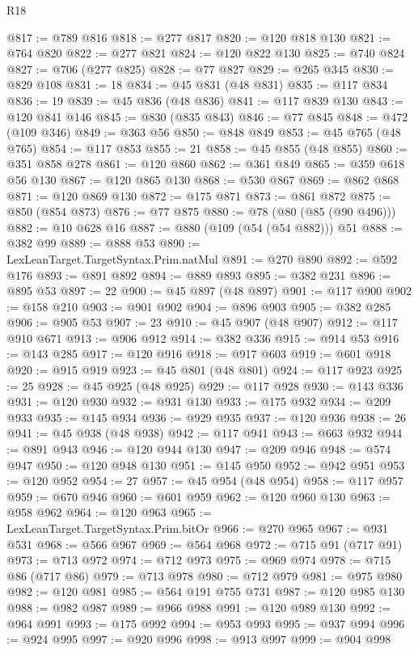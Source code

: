 \begin{lexlean}{R18}
\begin{coremodule}
@817 := @789 @816
@818 := @277 @817
@820 := @120 @818 @130
@821 := @764 @820
@822 := @277 @821
@824 := @120 @822 @130
@825 := @740 @824
@827 := @706 (@277 @825)
@828 := @77 @827
@829 := @265 @345
@830 := @829 @108
@831 := 18
@834 := @45 @831 (@48 @831)
@835 := @117 @834
@836 := 19
@839 := @45 @836 (@48 @836)
@841 := @117 @839 @130
@843 := @120 @841 @146
@845 := @830 (@835 @843)
@846 := @77 @845
@848 := @472 (@109 @346)
@849 := @363 @56
@850 := @848 @849
@853 := @45 @765 (@48 @765)
@854 := @117 @853
@855 := 21
@858 := @45 @855 (@48 @855)
@860 := @351 @858 @278
@861 := @120 @860
@862 := @361 @849
@865 := @359 @618 @56 @130
@867 := @120 @865 @130
@868 := @530 @867
@869 := @862 @868
@871 := @120 @869 @130
@872 := @175 @871
@873 := @861 @872
@875 := @850 (@854 @873)
@876 := @77 @875
@880 := @78 (@80 (@85 (@90 @496)))
@882 := @10 @628 @16
@887 := @880 (@109 (@54 (@54 @882))) @51
@888 := @382 @99
@889 := @888 @53
@890 := LexLeanTarget.TargetSyntax.Prim.natMul
@891 := @270 @890
@892 := @592 @176
@893 := @891 @892
@894 := @889 @893
@895 := @382 @231
@896 := @895 @53
@897 := 22
@900 := @45 @897 (@48 @897)
@901 := @117 @900
@902 := @158 @210
@903 := @901 @902
@904 := @896 @903
@905 := @382 @285
@906 := @905 @53
@907 := 23
@910 := @45 @907 (@48 @907)
@912 := @117 @910 @671
@913 := @906 @912
@914 := @382 @336
@915 := @914 @53
@916 := @143 @285
@917 := @120 @916
@918 := @917 @603
@919 := @601 @918
@920 := @915 @919
@923 := @45 @801 (@48 @801)
@924 := @117 @923
@925 := 25
@928 := @45 @925 (@48 @925)
@929 := @117 @928
@930 := @143 @336
@931 := @120 @930
@932 := @931 @130
@933 := @175 @932
@934 := @209 @933
@935 := @145 @934
@936 := @929 @935
@937 := @120 @936
@938 := 26
@941 := @45 @938 (@48 @938)
@942 := @117 @941
@943 := @663 @932
@944 := @891 @943
@946 := @120 @944 @130
@947 := @209 @946
@948 := @574 @947
@950 := @120 @948 @130
@951 := @145 @950
@952 := @942 @951
@953 := @120 @952
@954 := 27
@957 := @45 @954 (@48 @954)
@958 := @117 @957
@959 := @670 @946
@960 := @601 @959
@962 := @120 @960 @130
@963 := @958 @962
@964 := @120 @963
@965 := LexLeanTarget.TargetSyntax.Prim.bitOr
@966 := @270 @965
@967 := @931 @531
@968 := @566 @967
@969 := @564 @968
@972 := @715 @91 (@717 @91)
@973 := @713 @972
@974 := @712 @973
@975 := @969 @974
@978 := @715 @86 (@717 @86)
@979 := @713 @978
@980 := @712 @979
@981 := @975 @980
@982 := @120 @981
@985 := @564 @191 @755 @731
@987 := @120 @985 @130
@988 := @982 @987
@989 := @966 @988
@991 := @120 @989 @130
@992 := @964 @991
@993 := @175 @992
@994 := @953 @993
@995 := @937 @994
@996 := @924 @995
@997 := @920 @996
@998 := @913 @997
@999 := @904 @998

\end{coremodule}
\end{lexlean}
